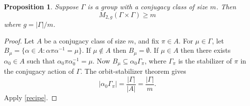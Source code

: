 \documentclass[12pt]{article}
\newtheorem{prop}{Proposition}
\begin{document}
\begin{prop}
Suppose $\Gamma$ is a group with a conjugacy class of size $m$. Then
$$M_{2,g}(\Gamma\times\Gamma)\ge m$$
where $g=|\Gamma|/m$.
\end{prop}
\begin{proof}
    Let $A$ be a conjugacy class of size $m$, and fix $\pi\in A$. For $\mu\in\Gamma$, let $B_\mu=\{\alpha\in A:\alpha\pi\alpha^{-1}=\mu\}$.
    If $\mu\not\in A$ then $B_\mu=\emptyset$. If $\mu\in A$ then there exists $\alpha_0\in A$ such that $\alpha_0\pi\alpha_0^{-1}=\mu$. Now $B_\mu\subseteq\alpha_0\Gamma_\pi$, where $\Gamma_\pi$ is the stabilizer of $\pi$ in the conjugacy action of $\Gamma$. The orbit-stabilizer theorem gives $$|\alpha_0\Gamma_\pi|=\frac{|\Gamma|}{|A|}=\frac{|\Gamma|}{m}.$$
    Apply \autoref{recipe}.
\end{proof}
\end{document}
